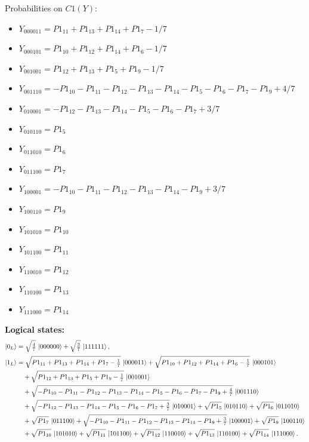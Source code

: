 \documentclass[11pt]{article}
\begin{document}
Probabilities on $C1 (Y)$:
\begin{itemize}
    \item $Y_{000011} = P1_{11} + P1_{13} + P1_{14} + P1_7 - 1/7$
    \item $Y_{000101} = P1_{10} + P1_{12} + P1_{14} + P1_6 - 1/7$
    \item $Y_{001001} = P1_{12} + P1_{13} + P1_5 + P1_9 - 1/7$
    \item $Y_{001110} = -P1_{10} - P1_{11} - P1_{12} - P1_{13} - P1_{14} - P1_5 - P1_6 - P1_7 - P1_9 + 4/7$
    \item $Y_{010001} = -P1_{12} - P1_{13} - P1_{14} - P1_5 - P1_6 - P1_7 + 3/7$
    \item $Y_{010110} = P1_5$
    \item $Y_{011010} = P1_6$
    \item $Y_{011100} = P1_7$
    \item $Y_{100001} = -P1_{10} - P1_{11} - P1_{12} - P1_{13} - P1_{14} - P1_9 + 3/7$
    \item $Y_{100110} = P1_9$
    \item $Y_{101010} = P1_{10}$
    \item $Y_{101100} = P1_{11}$
    \item $Y_{110010} = P1_{12}$
    \item $Y_{110100} = P1_{13}$
    \item $Y_{111000} = P1_{14}$
\end{itemize}

\noindent\textbf{Logical states:}
\begin{align*}
\ket{0_L} &= \sqrt{\tfrac{4}{7}}\,\ket{000000} + \sqrt{\tfrac{3}{7}}\,\ket{111111},
\\[2pt]
\ket{1_L} &= \sqrt{P1_{11} + P1_{13} + P1_{14} + P1_7 - \tfrac{1}{7}}\,\ket{000011} + \sqrt{P1_{10} + P1_{12} + P1_{14} + P1_6 - \tfrac{1}{7}}\,\ket{000101}\\
&\quad + \sqrt{P1_{12} + P1_{13} + P1_5 + P1_9 - \tfrac{1}{7}}\,\ket{001001}\\
&\quad + \sqrt{-P1_{10} - P1_{11} - P1_{12} - P1_{13} - P1_{14} - P1_5 - P1_6 - P1_7 - P1_9 + \tfrac{4}{7}}\,\ket{001110}\\
&\quad + \sqrt{-P1_{12} - P1_{13} - P1_{14} - P1_5 - P1_6 - P1_7 + \tfrac{3}{7}}\,\ket{010001} + \sqrt{P1_5}\,\ket{010110} + \sqrt{P1_6}\,\ket{011010}\\
&\quad + \sqrt{P1_7}\,\ket{011100} + \sqrt{-P1_{10} - P1_{11} - P1_{12} - P1_{13} - P1_{14} - P1_9 + \tfrac{3}{7}}\,\ket{100001} + \sqrt{P1_9}\,\ket{100110}\\
&\quad + \sqrt{P1_{10}}\,\ket{101010} + \sqrt{P1_{11}}\,\ket{101100} + \sqrt{P1_{12}}\,\ket{110010} + \sqrt{P1_{13}}\,\ket{110100} + \sqrt{P1_{14}}\,\ket{111000}.
\end{align*}
\end{document}
